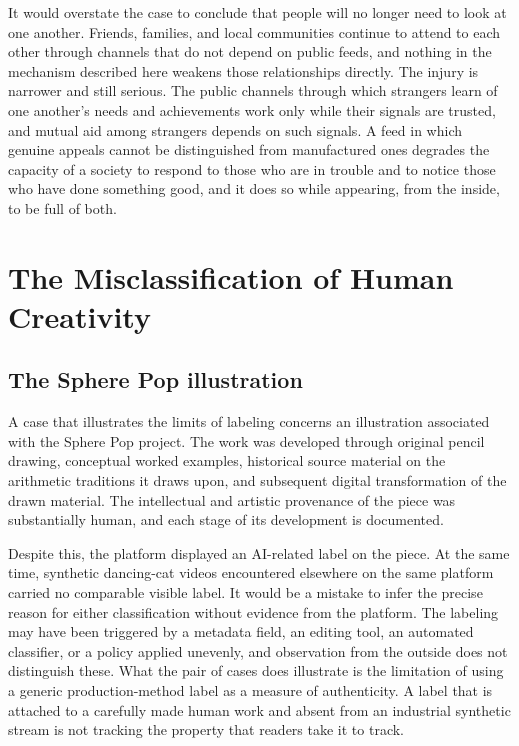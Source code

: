 \documentclass[12pt]{article}
\theoremstyle{plain}
\theoremstyle{definition}
\theoremstyle{remark}
\begin{document}
It would overstate the case to conclude that people will no longer need to look at one another. Friends, families, and local communities continue to attend to each other through channels that do not depend on public feeds, and nothing in the mechanism described here weakens those relationships directly. The injury is narrower and still serious. The public channels through which strangers learn of one another's needs and achievements work only while their signals are trusted, and mutual aid among strangers depends on such signals. A feed in which genuine appeals cannot be distinguished from manufactured ones degrades the capacity of a society to respond to those who are in trouble and to notice those who have done something good, and it does so while appearing, from the inside, to be full of both.

\section{The Misclassification of Human Creativity}

\subsection{The Sphere Pop illustration}

A case that illustrates the limits of labeling concerns an illustration associated with the Sphere Pop project. The work was developed through original pencil drawing, conceptual worked examples, historical source material on the arithmetic traditions it draws upon, and subsequent digital transformation of the drawn material. The intellectual and artistic provenance of the piece was substantially human, and each stage of its development is documented.

Despite this, the platform displayed an AI-related label on the piece. At the same time, synthetic dancing-cat videos encountered elsewhere on the same platform carried no comparable visible label. It would be a mistake to infer the precise reason for either classification without evidence from the platform. The labeling may have been triggered by a metadata field, an editing tool, an automated classifier, or a policy applied unevenly, and observation from the outside does not distinguish these. What the pair of cases does illustrate is the limitation of using a generic production-method label as a measure of authenticity. A label that is attached to a carefully made human work and absent from an industrial synthetic stream is not tracking the property that readers take it to track.
\end{document}
